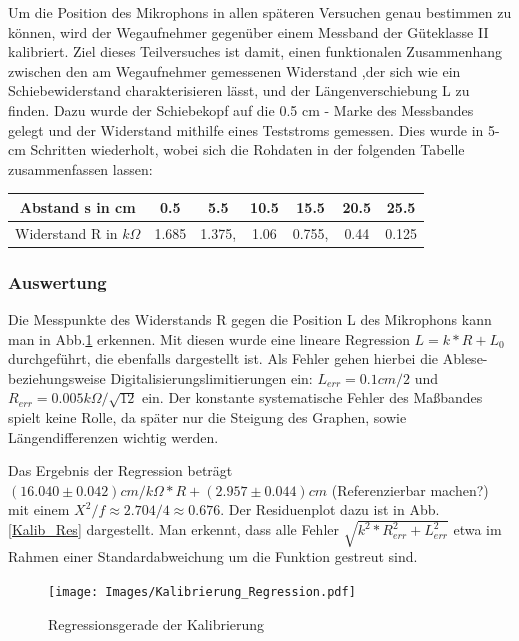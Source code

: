 \documentclass[]{article}
\begin{document}
	Um die Position des Mikrophons in allen späteren Versuchen genau bestimmen zu können, wird der Wegaufnehmer gegenüber einem Messband der Güteklasse II kalibriert. Ziel dieses Teilversuches ist damit, einen funktionalen Zusammenhang zwischen den am Wegaufnehmer gemessenen Widerstand ,der sich wie ein Schiebewiderstand charakterisieren lässt, und der Längenverschiebung L zu finden. Dazu wurde der {\color{red} {Schiebekopf}} auf die 0.5 cm - Marke des Messbandes gelegt und der Widerstand mithilfe eines Teststroms gemessen. Dies wurde in 5-cm Schritten wiederholt, wobei sich die Rohdaten in der folgenden Tabelle zusammenfassen lassen:

	\begin{center}
	\begin{tabular}{|c|c|c|c|c|c|c|}
		\hline 
		Abstand s in cm & 0.5 & 5.5 & 10.5 & 15.5 & 20.5 & 25.5 \\ 
		\hline 
		Widerstand R in $k\Omega$ & 1.685 & 1.375, & 1.06 & 0.755, & 0.44 & 0.125 \\ 
		\hline 
	\end{tabular} 
	\end{center}

	\subsubsection{Auswertung}

	Die Messpunkte des Widerstands R gegen die Position L des Mikrophons kann man in Abb.\ref{Kalib_Reg} erkennen. Mit diesen wurde eine lineare Regression $L=k*R+L_0$ durchgeführt, die ebenfalls dargestellt ist. Als Fehler gehen hierbei die Ablese- beziehungsweise Digitalisierungslimitierungen ein: $L_{err}=0.1cm/2$ und $R_{err}=0.005k\Omega/\sqrt{12}$ ein. Der konstante systematische Fehler des Maßbandes spielt keine Rolle, da später nur die Steigung des Graphen, sowie Längendifferenzen wichtig werden.      

	Das Ergebnis der Regression beträgt  $(16.040\pm0.042)cm/k\Omega*R+(2.957\pm0.044)cm$ {\color{red} {(Referenzierbar machen?)}} mit einem $X^2/f \approx 2.704/4 \approx 0.676$. Der Residuenplot dazu ist in Abb.\ref{Kalib_Res} dargestellt. Man erkennt, dass alle Fehler $\sqrt{k^2*R_{err}^2+L_{err}^2}$ etwa im Rahmen einer Standardabweichung um die Funktion gestreut sind.\\   

	\begin{figure}
	\begin{center}
		\texttt{[image: Images/Kalibrierung\_Regression.pdf]}
		\caption{Regressionsgerade der Kalibrierung}             
		\label{Kalib_Reg}               
	\end{center}            
	\end{figure} 
\end{document}
